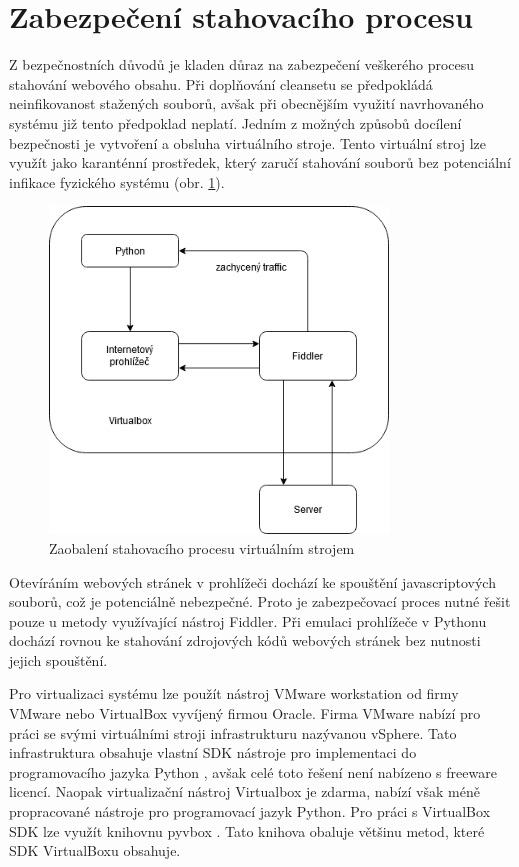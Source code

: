 \documentclass[thesis=M,czech,hidelinks]{FITthesis}[2013/05/06]
\begin{document}
\section{Zabezpečení stahovacího procesu}\label{sec:zabezpeceni}
Z bezpečnostních důvodů je kladen důraz na zabezpečení veškerého procesu stahování webového obsahu. Při doplňování cleansetu se předpokládá neinfikovanost stažených souborů, avšak při obecnějším využití navrhovaného systému již tento předpoklad neplatí. Jedním z možných způsobů docílení bezpečnosti je vytvoření a obsluha virtuálního stroje. Tento virtuální stroj lze využít jako karanténní prostředek, který zaručí stahování souborů bez potenciální infikace fyzického systému (obr. \ref{fig:virtualbox}).

\begin{figure}[h]
	\centering
	\includegraphics[width=9cm]{pictures/virtualbox.png}
	\caption{Zaobalení stahovacího procesu virtuálním strojem}
	\label{fig:virtualbox}
\end{figure}

Otevíráním webových stránek v prohlížeči dochází ke spouštění javascriptových souborů, což je potenciálně nebezpečné. Proto je zabezpečovací proces nutné řešit pouze u metody využívající nástroj Fiddler. Při emulaci prohlížeče v Pythonu dochází rovnou ke stahování zdrojových kódů webových stránek bez nutnosti jejich spouštění.

Pro virtualizaci systému lze použít nástroj VMware workstation od firmy VMware nebo VirtualBox vyvíjený firmou Oracle. Firma VMware nabízí pro práci se svými virtuálními stroji infrastrukturu nazývanou vSphere. Tato infrastruktura obsahuje vlastní SDK nástroje pro implementaci do programovacího jazyka Python \cite{vmware}, avšak celé toto řešení není nabízeno s freeware licencí. Naopak virtualizační nástroj Virtualbox je zdarma, nabízí však méně propracované nástroje pro programovací jazyk Python. Pro práci s VirtualBox SDK lze využít knihovnu pyvbox \cite{pyvbox}. Tato knihova obaluje většinu metod, které SDK VirtualBoxu obsahuje. 
\end{document}
